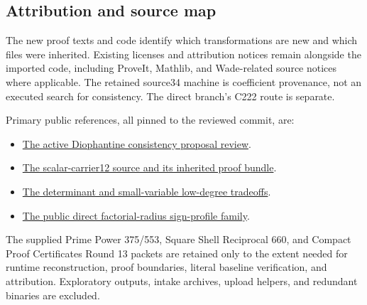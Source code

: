 \subsection{Attribution and source map}
The new proof texts and code identify which transformations are new and which files were inherited. Existing licenses and attribution notices remain alongside the imported code, including ProveIt, Mathlib, and Wade-related source notices where applicable. The retained source34 machine is coefficient provenance, not an executed search for consistency. The direct branch's C222 route is separate.

Primary public references, all pinned to the reviewed commit, are:
\begin{itemize}
\item \href{https://github.com/VladimirReshetnikov/ProveIt/blob/84e16e43092614bae262ca59651cb9d77e31a255/Computability/DiophantineConsistency/PROPOSAL_REVIEW_LATEST.md}{The active Diophantine consistency proposal review}.
\item \href{https://github.com/VladimirReshetnikov/ProveIt/tree/84e16e43092614bae262ca59651cb9d77e31a255/Computability/DiophantineConsistency/candidates/scalar-carrier12}{The scalar-carrier12 source and its inherited proof bundle}.
\item \href{https://github.com/VladimirReshetnikov/ProveIt/blob/84e16e43092614bae262ca59651cb9d77e31a255/Computability/DiophantineConsistency/candidates/scalar-carrier12/source/RESIDUE_AND_DETERMINANT.md}{The determinant and small-variable low-degree tradeoffs}.
\item \href{https://github.com/VladimirReshetnikov/ProveIt/tree/84e16e43092614bae262ca59651cb9d77e31a255/Computability/DiophantineConsistency/research/factorial-radius-output-sign-profile}{The public direct factorial-radius sign-profile family}.
\end{itemize}
The supplied Prime Power 375/553, Square Shell Reciprocal 660, and Compact Proof Certificates Round 13 packets are retained only to the extent needed for runtime reconstruction, proof boundaries, literal baseline verification, and attribution. Exploratory outputs, intake archives, upload helpers, and redundant binaries are excluded.
